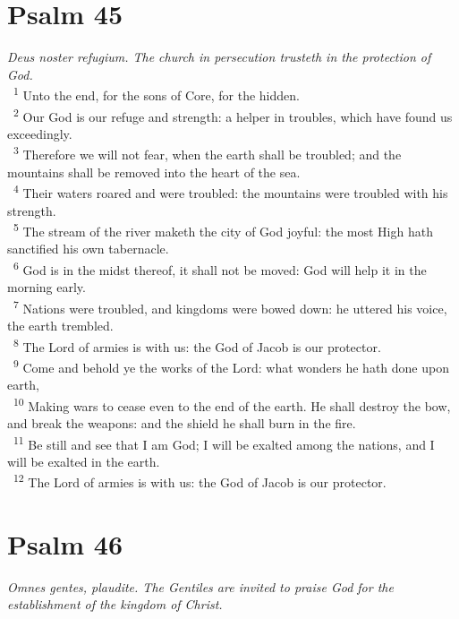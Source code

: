 \documentclass[a5paper,12pt]{article}
\begin{document}
\begin{multicols*}{2}
\section{Psalm 45}
\label{sec:org7c2a3d6}
\emph{Deus noster refugium. The church in persecution trusteth in the protection of God.}\\

~\textsuperscript{1} Unto the end, for the sons of Core, for the hidden.\\
~\textsuperscript{2} Our God is our refuge and strength: a helper in troubles, which have found us exceedingly.\\
~\textsuperscript{3} Therefore we will not fear, when the earth shall be troubled; and the mountains shall be removed into the heart of the sea.\\
~\textsuperscript{4} Their waters roared and were troubled: the mountains were troubled with his strength.\\
~\textsuperscript{5} The stream of the river maketh the city of God joyful: the most High hath sanctified his own tabernacle.\\
~\textsuperscript{6} God is in the midst thereof, it shall not be moved: God will help it in the morning early.\\
~\textsuperscript{7} Nations were troubled, and kingdoms were bowed down: he uttered his voice, the earth trembled.\\
~\textsuperscript{8} The Lord of armies is with us: the God of Jacob is our protector.\\
~\textsuperscript{9} Come and behold ye the works of the Lord: what wonders he hath done upon earth,\\
~\textsuperscript{10} Making wars to cease even to the end of the earth. He shall destroy the bow, and break the weapons: and the shield he shall burn in the fire.\\
~\textsuperscript{11} Be still and see that I am God; I will be exalted among the nations, and I will be exalted in the earth.\\
~\textsuperscript{12} The Lord of armies is with us: the God of Jacob is our protector.\\

\section{Psalm 46}
\label{sec:orgbc887b4}
\emph{Omnes gentes, plaudite. The Gentiles are invited to praise God for the establishment of the kingdom of Christ.}\\


\end{multicols*}
\end{document}
